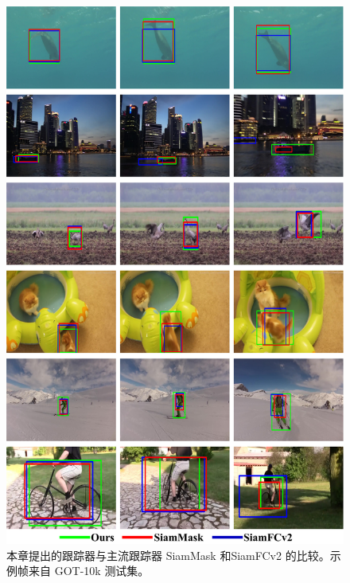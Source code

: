 \nopagebreak[3]
\begin{figure}[p!]
    \centering
    \includegraphics[width=1.0\textwidth]{Img/globally/visulization.pdf}
    \caption{本章提出的跟踪器与主流跟踪器 SiamMask \cite{Wang2018SiamMask} 和SiamFCv2\cite{SiamFC} 的比较。示例帧来自 GOT-10k \cite{GOT-10k} 测试集。}
    \label{fig:visulization}
\end{figure}
\nopagebreak[3]

